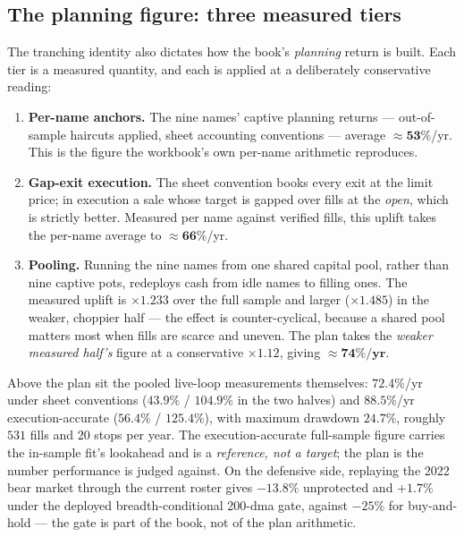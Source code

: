 \documentclass[11pt]{article}
\begin{document}
\subsection{The planning figure: three measured tiers}\label{sec:plan}

The tranching identity also dictates how the book's \emph{planning} return is built. Each tier is
a measured quantity, and each is applied at a deliberately conservative reading:

\begin{enumerate}[topsep=2pt,itemsep=2pt]
\item \textbf{Per-name anchors.} The nine names' captive planning returns --- out-of-sample
      haircuts applied, sheet accounting conventions --- average $\approx\mathbf{53\%}$/yr. This
      is the figure the workbook's own per-name arithmetic reproduces.
\item \textbf{Gap-exit execution.} The sheet convention books every exit at the limit price; in
      execution a sale whose target is gapped over fills at the \emph{open}, which is strictly
      better. Measured per name against verified fills, this uplift takes the per-name average to
      $\approx\mathbf{66\%}$/yr.
\item \textbf{Pooling.} Running the nine names from one shared capital pool, rather than nine
      captive pots, redeploys cash from idle names to filling ones. The measured uplift is
      $\times1.233$ over the full sample and larger ($\times1.485$) in the weaker, choppier half
      --- the effect is counter-cyclical, because a shared pool matters most when fills are
      scarce and uneven. The plan takes the \emph{weaker measured half's} figure at a
      conservative $\times1.12$, giving $\mathbf{\approx74\%/yr}$.
\end{enumerate}

Above the plan sit the pooled live-loop measurements themselves: $72.4\%$/yr under sheet
conventions ($43.9\%$ / $104.9\%$ in the two halves) and $88.5\%$/yr execution-accurate
($56.4\%$ / $125.4\%$), with maximum drawdown $24.7\%$, roughly $531$ fills and $20$ stops per
year. The execution-accurate full-sample figure carries the in-sample fit's lookahead and is a
\emph{reference, not a target}; the plan is the number performance is judged against. On the
defensive side, replaying the 2022 bear market through the current roster gives $-13.8\%$
unprotected and $+1.7\%$ under the deployed breadth-conditional 200-dma gate, against
$-25\%$ for buy-and-hold --- the gate is part of the book, not of the plan arithmetic.
\end{document}
